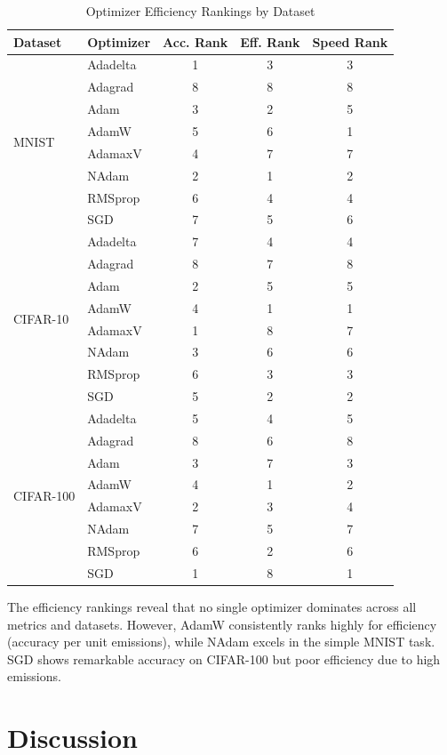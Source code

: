 \documentclass[conference]{IEEEtran}
\begin{document}
\begin{table}[htbp]
\centering
\caption{Optimizer Efficiency Rankings by Dataset}
\label{tab:efficiency_rankings}
\footnotesize
\begin{tabular}{@{}llccc@{}}
\toprule
Dataset & Optimizer & Acc. Rank & Eff. Rank & Speed Rank \\
\midrule
\multirow{8}{*}{MNIST}
& Adadelta & 1 & 3 & 3 \\
& Adagrad & 8 & 8 & 8 \\
& Adam & 3 & 2 & 5 \\
& AdamW & 5 & 6 & 1 \\
& AdamaxV & 4 & 7 & 7 \\
& NAdam & 2 & 1 & 2 \\
& RMSprop & 6 & 4 & 4 \\
& SGD & 7 & 5 & 6 \\
\midrule
\multirow{8}{*}{CIFAR-10}
& Adadelta & 7 & 4 & 4 \\
& Adagrad & 8 & 7 & 8 \\
& Adam & 2 & 5 & 5 \\
& AdamW & 4 & 1 & 1 \\
& AdamaxV & 1 & 8 & 7 \\
& NAdam & 3 & 6 & 6 \\
& RMSprop & 6 & 3 & 3 \\
& SGD & 5 & 2 & 2 \\
\midrule
\multirow{8}{*}{CIFAR-100}
& Adadelta & 5 & 4 & 5 \\
& Adagrad & 8 & 6 & 8 \\
& Adam & 3 & 7 & 3 \\
& AdamW & 4 & 1 & 2 \\
& AdamaxV & 2 & 3 & 4 \\
& NAdam & 7 & 5 & 7 \\
& RMSprop & 6 & 2 & 6 \\
& SGD & 1 & 8 & 1 \\
\bottomrule
\end{tabular}
\end{table}

The efficiency rankings reveal that no single optimizer dominates across all metrics and datasets. However, AdamW consistently ranks highly for efficiency (accuracy per unit emissions), while NAdam excels in the simple MNIST task. SGD shows remarkable accuracy on CIFAR-100 but poor efficiency due to high emissions.

\section{Discussion}
\end{document}
